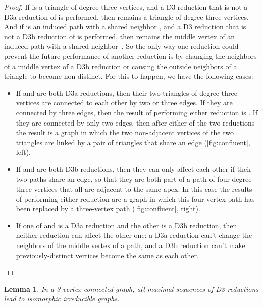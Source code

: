 \documentclass{article}
\newtheorem{lemma}{Lemma}
\begin{document}
\begin{proof}
If  is a triangle of degree-three vertices, and a D3 reduction that is not a D3a reduction of  is performed, then  remains a triangle of degree-three vertices.
And if  is an induced path with a shared neighbor , and a D3 reduction that is not a D3b reduction of  is performed, then  remains the middle vertex of an induced path with a shared neighbor~. So the only way one reduction  could prevent the future performance of another reduction  is by changing the neighbors of a middle vertex  of a D3b reduction or causing the outside neighbors of a triangle to become non-distinct.
For this to happen, we have the following cases:
\begin{itemize}
\item If  and  are both D3a reductions, then their two triangles of degree-three vertices are connected to each other by two or three edges. If they are connected by three edges, then the result of performing either reduction is . If they are connected by only two edges, then after either of the two reductions the result is a graph in which the two non-adjacent vertices of the two triangles are linked by a pair of triangles that share an edge (\autoref{fig:confluent}, left).
\item If  and  are both D3b reductions, then they can only affect each other if their two paths share an edge, so that they are both part of a path of four degree-three vertices that all are adjacent to the same apex. In this case the results of performing either reduction are a graph in which this four-vertex path has been replaced by a three-vertex path (\autoref{fig:confluent}, right).
\item If one of  and  is a D3a reduction and the other is a D3b reduction, then neither reduction can affect the other one: a D3a reduction can't change the neighbors of the middle vertex of a path, and a D3b reduction can't make previously-distinct vertices become the same as each other.\qedhere
\end{itemize}
\end{proof}

\begin{lemma}
\label{lem:confluence}
In a 3-vertex-connected graph, all maximal sequences of D3 reductions lead to isomorphic irreducible graphs.
\end{lemma}
\end{document}
